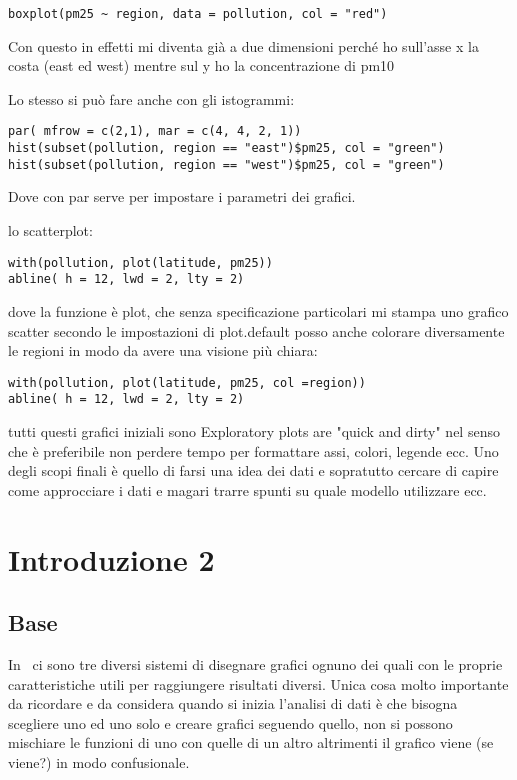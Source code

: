 \begin{lstlisting}
boxplot(pm25 ~ region, data = pollution, col = "red")
\end{lstlisting} 
Con questo in effetti mi diventa già a due dimensioni perché ho sull'asse x la costa (east ed west) mentre sul y ho la concentrazione di pm10

Lo stesso si può fare anche con gli istogrammi:
\begin{lstlisting}
par( mfrow = c(2,1), mar = c(4, 4, 2, 1))
hist(subset(pollution, region == "east")$pm25, col = "green")
hist(subset(pollution, region == "west")$pm25, col = "green")
\end{lstlisting} 

Dove con par serve per impostare i parametri dei grafici.


lo scatterplot:
\begin{lstlisting}
with(pollution, plot(latitude, pm25))
abline( h = 12, lwd = 2, lty = 2)
\end{lstlisting} 
dove la funzione è plot, che senza specificazione particolari mi stampa uno grafico scatter secondo le impostazioni di plot.default
posso anche colorare diversamente le regioni in modo da avere una visione più chiara:
\begin{lstlisting}
with(pollution, plot(latitude, pm25, col =region))
abline( h = 12, lwd = 2, lty = 2)
\end{lstlisting} 

tutti questi grafici iniziali sono Exploratory plots are "quick and dirty" nel senso che è preferibile non perdere tempo per formattare assi, colori, legende ecc.
Uno degli scopi finali è quello di farsi una idea dei dati e sopratutto cercare di capire come approcciare i dati e magari trarre spunti su quale modello utilizzare ecc.

\section{Introduzione 2}
\subsection{Base}
In \erre\ ci sono tre diversi sistemi di disegnare grafici ognuno dei quali con le proprie caratteristiche utili per raggiungere risultati diversi. Unica cosa molto  importante da ricordare e da considera quando si inizia l'analisi di dati è che bisogna scegliere uno ed uno solo e creare grafici seguendo quello, non si possono mischiare le funzioni di uno con quelle di un altro altrimenti il grafico viene (se viene?) in modo confusionale.

